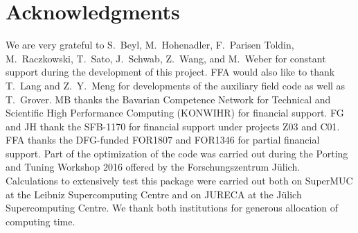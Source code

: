 

\section*{Acknowledgments} 

We are very grateful to  S.~Beyl, M.~Hohenadler,  F.~Parisen Toldin,  M.~Raczkowski, T.~Sato, J.~Schwab, Z.~Wang, and M.~Weber  for constant support during the development of this project. 
FFA would also like to thank T.~Lang   and Z.~Y.~Meng for  developments of the auxiliary field code as well as T.~Grover. 
MB thanks the Bavarian Competence Network for Technical and Scientific High Performance Computing (KONWIHR) for financial support. FG  and JH thank the SFB-1170 for  financial support under projects Z03 and C01.  FFA thanks the DFG-funded FOR1807 and FOR1346 for partial financial support.
Part of the optimization of the code was carried out during  the  Porting and Tuning Workshop 2016 offered by the Forschungszentrum J\"ulich.
Calculations  to extensively test this package were carried out both on  SuperMUC at the  Leibniz Supercomputing Centre and on  JURECA  \cite{Jureca16} at the J\"ulich Supercomputing Centre.  We thank both institutions for generous allocation of computing time.
